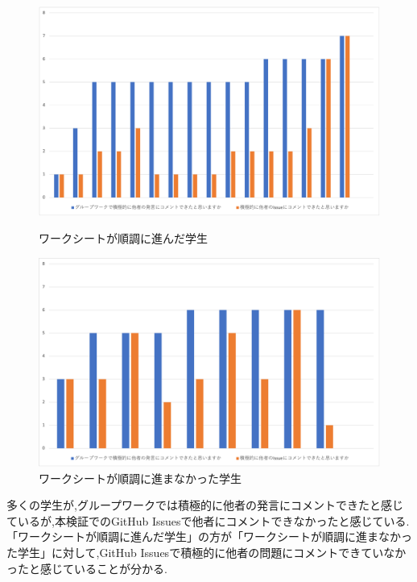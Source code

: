 \documentclass[11pt, a4paper]{jreport}
\begin{document}
\begin{figure}[htbp]
  \begin{minipage}[c]{.5\linewidth}
    \centering
    \includegraphics[width=1\linewidth]{img/gh_vs_gw_yes.png}
    \caption{ワークシートが順調に進んだ学生}
    \label{fig:gh_vs_gw_yes}
  \end{minipage}
  \begin{minipage}[c]{.5\linewidth}
    \centering
    \includegraphics[width=1\linewidth]{img/gh_vs_gw_not.png}
    \caption{ワークシートが順調に進まなかった学生}
    \label{fig:gh_vs_gw_not}
  \end{minipage}
\end{figure}

多くの学生が,グループワークでは積極的に他者の発言にコメントできたと感じているが,本検証でのGitHub Issuesで他者にコメントできなかったと感じている.「ワークシートが順調に進んだ学生」の方が「ワークシートが順調に進まなかった学生」に対して,GitHub Issuesで積極的に他者の問題にコメントできていなかったと感じていることが分かる.
\end{document}
